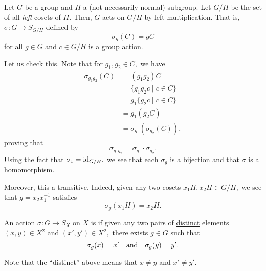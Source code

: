
\begin{ex} \label{ex:cosetaction}
	Let $G$ be a group and $H$ a (not necessarily normal) subgroup. Let $G/H$ be the set of all \emph{left} cosets of $H.$ Then, $G$ acts on $G/H$ by left multiplication. That is, $\sigma : G \to S_{G/H}$ defined by
	\begin{equation*} 
		\sigma_g(C) = gC
	\end{equation*}
	for all $g \in G$ and $c \in G/H$ is a group action.

	Let us check this. Note that for $g_1, g_2 \in C,$ we have
	\begin{align*} 
		\sigma_{g_1g_2}(C) &= (g_1g_2)C\\
		&= \{g_1g_2c \mid c \in C\}\\
		&= g_1\{g_2c \mid c \in C\}\\
		&= g_1 (g_2 C)\\
		&= \sigma_{g_1}(\sigma_{g_2}(C)),
	\end{align*}
	proving that
	\begin{equation*} 
		\sigma_{g_1g_2} = \sigma_{g_1} \cdot \sigma_{g_2}.
	\end{equation*}
	Using the fact that $\sigma_1 = \operatorname{id}_{G/H},$ we see that each $\sigma_g$ is a bijection and that $\sigma$ is a homomorphism.

	Moreover, this a transitive. Indeed, given any two cosets $x_1H, x_2H \in G/H,$ we see that $g = x_2x_1^{-1}$ satisfies
	\begin{equation*} 
		\sigma_g(x_1H) = x_2H. 
	\end{equation*}
\end{ex}

\begin{defn}%
	An action $\sigma : G \to S_X$ on $X$ is  if given any two pairs of \underline{distinct} elements $(x, y) \in X^2$ and $(x', y') \in X^2,$ there exists $g \in G$ such that
	\begin{equation*} 
		\sigma_g(x) = x' \quad\text{and}\quad \sigma_g(y) = y'.
	\end{equation*}
\end{defn}
Note that the ``distinct'' above means that $x \neq y$ and $x' \neq y'.$ 

